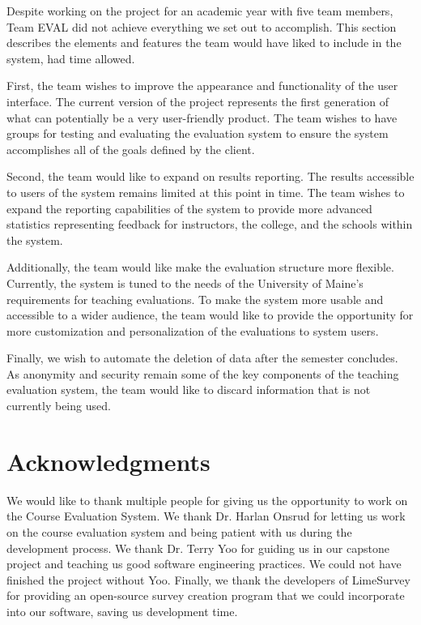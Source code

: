 \documentclass{article}
\begin{document}
Despite working on the project for an academic year with five team members, Team EVAL did not achieve everything we set out to accomplish. This section describes the elements and features the team would have liked to include in the system, had time allowed. 

First, the team wishes to improve the appearance and functionality of the user interface. The current version of the project represents the first generation of what can potentially be a very user-friendly product. The team wishes to have groups for testing and evaluating the evaluation system to ensure the system accomplishes all of the goals defined by the client. 

Second, the team would like to expand on results reporting. The results accessible to users of the system remains limited at this point in time. The team wishes to expand the reporting capabilities of the system to provide more advanced statistics representing feedback for instructors, the college, and the schools within the system. 

Additionally, the team would like make the evaluation structure more flexible. Currently, the system is tuned to the needs of the University of Maine's requirements for teaching evaluations. To make the system more usable and accessible to a wider audience, the team would like to provide the opportunity for more customization and personalization of the evaluations to system users. 

Finally, we wish to automate the deletion of data after the semester concludes. As anonymity and security remain some of the key components of the teaching evaluation system, the team would like to discard information that is not currently being used. 

\section{Acknowledgments}

We would like to thank multiple people for giving us the opportunity to work on the Course Evaluation System. We thank Dr. Harlan Onsrud for letting us work on the course evaluation system and being patient with us during the development process. We thank Dr. Terry Yoo for guiding us in our capstone project and teaching us good software engineering practices. We could not have finished the project without Yoo. Finally, we thank the developers of LimeSurvey for providing an open-source survey creation program that we could incorporate into our software, saving us development time.
\end{document}
